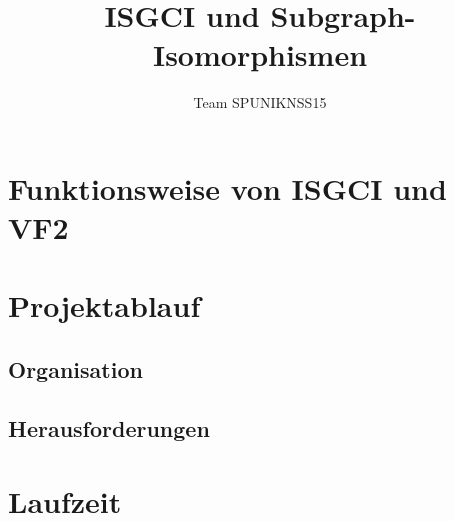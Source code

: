 \documentclass[t]{beamer}
\title{ISGCI und Subgraph-Isomorphismen}
\author{Team SPUNIKNSS15}
\date{}
\begin{document}
  
  \section{Funktionsweise von ISGCI und VF2}
    
    
  \section{Projektablauf}
    
    \subsection{Organisation}
      
    \subsection{Herausforderungen}
      
  \section{Laufzeit}
  
\end{document}
